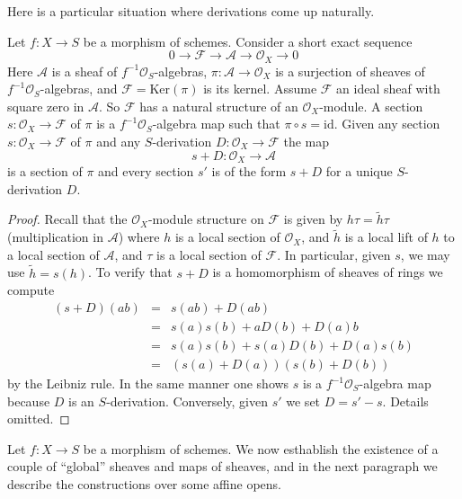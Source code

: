\noindent
Here is a particular situation where derivations come up
naturally.

\begin{lemma}
\label{lemma-double-structure-gives-derivation}
Let $f : X \to S$ be a morphism of schemes.
Consider a short exact sequence
$$
0 \to \mathcal{F} \to \mathcal{A} \to \mathcal{O}_X \to 0
$$
Here $\mathcal{A}$ is a sheaf of $f^{-1}\mathcal{O}_S$-algebras,
$\pi : \mathcal{A} \to \mathcal{O}_X$ is a surjection
of sheaves of $f^{-1}\mathcal{O}_S$-algebras, and
$\mathcal{F} = \text{Ker}(\pi)$ is its kernel. Assume $\mathcal{F}$ an ideal
sheaf with square zero in $\mathcal{A}$. So $\mathcal{F}$
has a natural structure of an $\mathcal{O}_X$-module.
A section $s : \mathcal{O}_X \to \mathcal{F}$ of $\pi$
is a $f^{-1}\mathcal{O}_S$-algebra map such that $\pi \circ s = \text{id}$.
Given any section $s : \mathcal{O}_X \to \mathcal{F}$
of $\pi$ and any $S$-derivation $D : \mathcal{O}_X \to \mathcal{F}$
the map
$$
s + D : \mathcal{O}_X \to \mathcal{A}
$$
is a section of $\pi$ and every section $s'$ is of the form $s + D$
for a unique $S$-derivation $D$.
\end{lemma}

\begin{proof}
Recall that the $\mathcal{O}_X$-module structure on $\mathcal{F}$
is given by $h \tau = \tilde h \tau$ (multiplication in $\mathcal{A}$)
where $h$ is a local section of $\mathcal{O}_X$, and
$\tilde h$ is a local lift of $h$ to a local
section of $\mathcal{A}$, and $\tau$ is a local section of $\mathcal{F}$.
In particular, given $s$, we may use $\tilde h = s(h)$.
To verify that $s + D$ is a homomorphism of sheaves of rings we
compute
\begin{eqnarray*}
(s + D)(ab) & = & s(ab) + D(ab) \\
& = & s(a)s(b) + aD(b) + D(a)b \\
& = & s(a) s(b) + s(a)D(b) + D(a)s(b) \\
& = & (s(a) + D(a))(s(b) + D(b))
\end{eqnarray*}
by the Leibniz rule. In the same manner one shows
$s$ is a $f^{-1}\mathcal{O}_S$-algebra
map because $D$ is an $S$-derivation. Conversely, given $s'$ we set
$D = s' - s$. Details omitted.
\end{proof}

\noindent
Let $f : X \to S$ be a morphism of schemes.
We now esthablish the existence of a couple of ``global'' sheaves
and maps of sheaves, and in the next paragraph we describe
the constructions over some affine opens.

